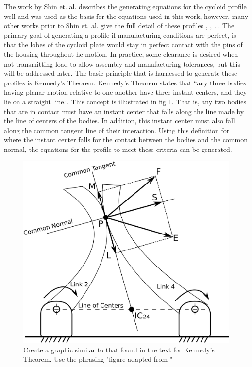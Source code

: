 The work by Shin et. al. \cite{ref:on_the_lobe} describes the generating equations for the cycloid profile well and was used as the basis for the equations used in this work, however, many other works prior to Shin et. al. give the full detail of these profiles \cite{ref:malhorta}, \cite{ref:hwang_hsieh}, \cite{ref:design_and_application}.
.
The primary goal of generating a profile if manufacturing conditions are perfect, is that the lobes of the cycloid plate would stay in perfect contact with the pins of the housing throughout he motion. In practice, some clearance is desired when not transmitting load to allow assembly and manufacturing tolerances, but this will be addressed later. The basic principle that is harnessed to generate these profiles is Kennedy's Theorem. Kennedy's Theorem states that ``any three bodies having planar motion relative to one another have three instant centers, and they lie on a straight line.''\cite{ref:kinematics_and_dynamics}. This concept is illustrated in fig \ref{fig:kennedy_sliding}. That is, any two bodies that are in contact must have an instant center that falls along the line made by the line of centers of the bodies. In addition, this instant center must also fall along the common tangent line of their interaction. Using this definition for where the instant center falls for the contact between the bodies and the common normal, the equations for the profile to meet these criteria can be generated. 

\begin{figure}[!b]
   \centering
   \includegraphics[width=0.60\linewidth]{fig/kennedy_sliding}
   \caption{Create a graphic similar to that found in the text for Kennedy's Theorem. Use the phrasing "figure adapted from \cite{ref:kinematics_and_dynamics}"}
   \label{fig:kennedy_sliding}
\end{figure}

